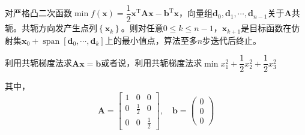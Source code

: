 \begin{theorem}[二次终止性]
    对严格凸二次函数$\min f(\boldsymbol{x}) = \dfrac{1}{2}\boldsymbol{x}^{\mathrm{T}}\boldsymbol{Ax}-\boldsymbol{b}^{\mathrm{T}}\boldsymbol{x}$，向量组$\boldsymbol{d}_0,\boldsymbol{d}_1,\cdots,\boldsymbol{d}_{n-1}$关于$\boldsymbol{A}$共轭。共轭方向发产生点列$\left\{ \boldsymbol{x}_{k} \right\}$。则对任意$0\leqslant k\leqslant n-1$，$\boldsymbol{x}_{k+1}$是目标函数在仿射集$\boldsymbol{x}_0+\operatorname{span}\left[ \boldsymbol{d}_0,\cdots,\boldsymbol{d}_{k} \right]$上的最小值点，算法至多$n$步迭代后终止。
\end{theorem}
\begin{example}
    利用共轭梯度法求$\boldsymbol{Ax} = \boldsymbol{b}$或者说，利用共轭梯度法求$\min x_1^2+\dfrac{1}{2}x_2^2+\dfrac{1}{2}x_3^2$\quad{}

    其中，
    \[
        \boldsymbol{A} = \begin{bmatrix}
            1 & 0 & 0\\
            0 & \frac{1}{2} & 0 \\
            0 & 0 & \frac{1}{2}
        \end{bmatrix},\quad
        \boldsymbol{b} = \begin{pmatrix}
            0\\0\\0
        \end{pmatrix}
    \]


\end{example}
